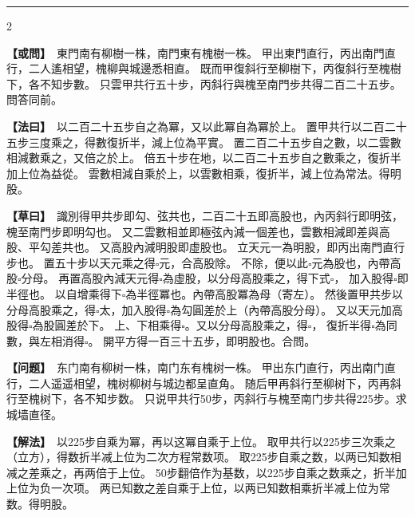 \documentclass[11pt,a4paper]{article}
\let\origsquare\square
\renewcommand{\square}{\ensuremath{\origsquare}}%
\newcommand{\longline}{\noindent\rule{\textwidth}{0.4pt}}
\newcommand{\clOWEN}[1]{%
  \par\vspace{0.3em}%
  \noindent\textcolor{problemcolor}{\textbf{【或問】}}\,{\tradfont #1}\par\nopagebreak%
}
\newcommand{\mdOWEN}[1]{%
  \par\vspace{0.3em}%
  \noindent\textcolor{problemcolor}{\textbf{【问题】}}\,{\modfont #1}\par\nopagebreak%
}
\newcommand{\clFAYUE}[1]{%
  \par\noindent\textcolor{methodcolor}{\textbf{【法曰】}}\,{\tradfont #1}\par\nopagebreak%
}
\newcommand{\mdFAYUE}[1]{%
  \par\noindent\textcolor{methodcolor}{\textbf{【解法】}}\,{\modfont #1}\par\nopagebreak%
}
\newcommand{\clTSAOYUE}[1]{%
  \par\noindent\textcolor{workcolor}{\textbf{【草曰】}}\,{\tradfont #1}\par%
}
\begin{document}
\vspace{0.3cm}
\begin{center}\longline\end{center}

\begin{paracol}{2}

\begin{leftcolumn}
\clOWEN{%
東門南有柳樹一株，南門東有槐樹一株。
甲出東門直行，丙出南門直行，二人遙相望，槐柳與城邊悉相直。
既而甲復斜行至柳樹下，丙復斜行至槐樹下，各不知步數。
只雲甲共行五十步，丙斜行與槐至南門步共得二百二十五步。問答同前。}

\clFAYUE{%
以二百二十五步自之為冪，又以此冪自為冪於上。
置甲共行以二百二十五步三度乘之，得數復折半，減上位為平實。
置二百二十五步自之數，以二雲數相減數乘之，又倍之於上。
倍五十步在地，以二百二十五步自之數乘之，復折半加上位為益從。
雲數相減自乘於上，以雲數相乘，復折半，減上位為常法。得明股。}

\clTSAOYUE{%
識別得甲共步即勾、弦共也，二百二十五即高股也，內丙斜行即明弦，槐至南門步即明勾也。
又二雲數相並即極弦內減一個差也，雲數相減即差與高股、平勾差共也。
又高股內減明股即虛股也。
立天元一為明股，即丙出南門直行步也。
置五十步以天元乘之得$\square$元，合高股除。
不除，便以此$\square$元為股也，內帶高股$\square$分母。
再置高股內減天元得$\square$為虛股，以分母高股乘之，得下式$\square$，
加入股得$\square$即半徑也。
以自增乘得下$\square$為半徑冪也。內帶高股冪為母（寄左）。
然後置甲共步以分母高股乘之，得$\square$太，加入股得$\square$為勾圓差於上（內帶高股分母）。
又以天元加高股得$\square$為股圓差於下。
上、下相乘得$\square$。又以分母高股乘之，得$\square$，
復折半得$\square$為同數，與左相消得$\square$。
開平方得一百三十五步，即明股也。合問。}
\end{leftcolumn}

\switchcolumn

\begin{rightcolumn}
\mdOWEN{%
东门南有柳树一株，南门东有槐树一株。
甲出东门直行，丙出南门直行，二人遥遥相望，槐树柳树与城边都呈直角。
随后甲再斜行至柳树下，丙再斜行至槐树下，各不知步数。
只说甲共行50步，丙斜行与槐至南门步共得225步。求城墙直径。}

\mdFAYUE{%
以225步自乘为冪，再以这冪自乘于上位。
取甲共行以225步三次乘之（立方），得数折半减上位为二次方程常数项。
取225步自乘之数，以两已知数相减之差乘之，再两倍于上位。
50步翻倍作为基数，以225步自乘之数乘之，折半加上位为负一次项。
两已知数之差自乘于上位，以两已知数相乘折半减上位为常数。得明股。}


\end{rightcolumn}
\end{paracol}
\end{document}
